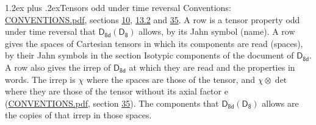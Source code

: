 \documentclass[10pt,a4paper]{article}
\makeatletter
\renewcommand\section{\@startsection{section}{1}{\z@}{-3ex plus -1ex minus -.2ex}%
  {1.2ex plus .2ex}{\normalfont\large\sffamily\bfseries\color{parttitle}}}
\numberwithin{equation}{section}
\newcommand{\grp}[1]{\mathsf{#1}}
\newcommand{\irrprod}{\otimes}
\makeatother
\begin{document}
\section{Tensors odd under time reversal}\label{s:time_odd}
Conventions: \href{../../CONVENTIONS.pdf}{CONVENTIONS.pdf}, sections \href{../../../rotation/CONVENTIONS.pdf\#conv.10}{10}, \href{../../../rotation/CONVENTIONS.pdf\#conv.13.2}{13.2} and \href{../../CONVENTIONS.pdf\#conv.35}{35}.
\leavevmode\label{n:head.name.property}A row is a tensor property odd under time reversal that $\grp{D_{8d}}(\grp{D_{8}})$ allows, by its Jahn symbol (name). \label{n:head.spaces}A row gives the spaces of Cartesian tensors in which its components are read (spaces), by their Jahn symbols in the section Isotypic components of the document of \href{../../../rotation/data/pdf/D8d.pdf}{$\grp{D_{8d}}$}. \label{n:head.properties}A row also gives the irrep of $\grp{D_{8d}}$ at which they are read and the properties in words. The irrep is $\chi$ where the spaces are those of the tensor, and $\chi \irrprod \det$ where they are those of the tensor without its axial factor e (\href{../../CONVENTIONS.pdf}{CONVENTIONS.pdf}, section \href{../../CONVENTIONS.pdf\#conv.35}{35}). The components that $\grp{D_{8d}}(\grp{D_{8}})$ allows are the copies of that irrep in those spaces.
\end{document}
